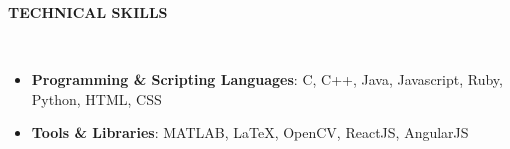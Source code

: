 \documentclass[a4paper,10pt]{article}
\newcommand{\resheading}[1]{{\small \colorbox{mygrey}{\begin{minipage}{0.99\textwidth}{\textbf{#1 \vphantom{p\^{E}}}}\end{minipage}}}}
\begin{document}
\noindent
\resheading{\textbf{TECHNICAL SKILLS}}\\[-0.4cm]
 \begin{itemize}
  \item \textbf{Programming \& Scripting Languages}: C, C++, Java, Javascript, Ruby, Python, HTML, CSS\\[-0.6cm]
  \item \textbf{Tools \& Libraries}: MATLAB, \LaTeX, OpenCV, ReactJS, AngularJS \\[-0.5cm]

  \end{itemize}
\end{document}
